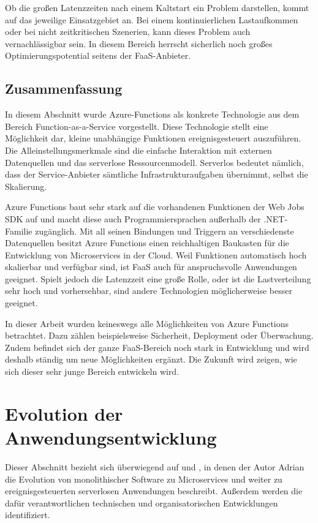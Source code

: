 Ob die großen Latenzzeiten nach einem Kaltstart ein Problem darstellen, kommt auf das jeweilige Einsatzgebiet an. Bei einem kontinuierlichen Lastaufkommen oder bei nicht zeitkritischen Szenerien, kann dieses Problem auch vernachlässigbar sein. In diesem Bereich herrscht sicherlich noch großes Optimierungspotential seitens der FaaS-Anbieter.

\subsection{Zusammenfassung}

In diesem Abschnitt wurde Azure-Functions als konkrete Technologie aus dem Bereich Function-as-a-Service vorgestellt. Diese Technologie stellt eine Möglichkeit dar, kleine unabhängige Funktionen ereignisgesteuert auszuführen. Die Alleinstellungsmerkmale sind die einfache Interaktion mit externen Datenquellen und das serverlose Ressourcenmodell. Serverlos bedeutet nämlich, dass der Service-Anbieter sämtliche Infrastrukturaufgaben übernimmt, selbst die Skalierung.

Azure Functions baut sehr stark auf die vorhandenen Funktionen der Web Jobs SDK auf und macht diese auch Programmiersprachen außerhalb der .NET-Familie zugänglich. Mit all seinen Bindungen und Triggern an verschiedenste Datenquellen besitzt Azure Functions einen reichhaltigen Baukasten für die Entwicklung von Microservices in der Cloud. Weil Funktionen automatisch hoch skalierbar und verfügbar sind, ist FaaS auch für anspruchsvolle Anwendungen geeignet. Spielt jedoch die Latenzzeit eine große Rolle, oder ist die Lastverteilung sehr hoch und vorhersehbar, sind andere Technologien möglicherweise besser geeignet.

In dieser Arbeit wurden keineswegs alle Möglichkeiten von Azure Functions betrachtet. Dazu zählen beispielsweise Sicherheit, Deployment oder Überwachung. Zudem befindet sich der ganze FaaS-Bereich noch stark in Entwicklung und wird deshalb ständig um neue Möglichkeiten ergänzt. Die Zukunft wird zeigen, wie sich dieser sehr junge Bereich entwickeln wird.

\section{Evolution der Anwendungsentwicklung}

Dieser Abschnitt bezieht sich überwiegend auf \cite{Cock16EvoFunc} und \cite{Cock17ShrinkingMS}, in denen der Autor Adrian \citeauthor{Cock16EvoFunc} die Evolution von monolithischer Software zu Microservices und weiter zu ereignisgesteuerten serverlosen Anwendungen beschreibt. Außerdem werden die dafür verantwortlichen technischen und organisatorischen Entwicklungen identifiziert.

